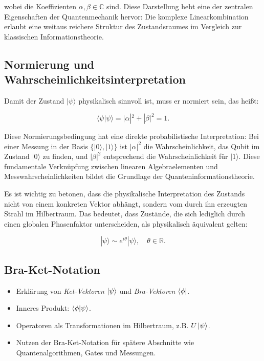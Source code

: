 wobei die Koeffizienten $\alpha, \beta \in \mathbb{C}$ sind. Diese Darstellung hebt eine der zentralen Eigenschaften der Quantenmechanik hervor: Die komplexe Linearkombination erlaubt eine weitaus reichere Struktur des Zustandsraumes im Vergleich zur klassischen Informationstheorie.

\vspace{0.5em}
\subsection*{Normierung und Wahrscheinlichkeitsinterpretation}

Damit der Zustand $|\psi\rangle$ physikalisch sinnvoll ist, muss er normiert sein, das heißt:

\begin{equation}
\langle \psi | \psi \rangle = |\alpha|^2 + |\beta|^2 = 1.
\end{equation}

Diese Normierungsbedingung hat eine direkte probabilistische Interpretation: Bei einer Messung in der Basis $\{ |0\rangle, |1\rangle \}$ ist $|\alpha|^2$ die Wahrscheinlichkeit, das Qubit im Zustand $|0\rangle$ zu finden, und $|\beta|^2$ entsprechend die Wahrscheinlichkeit für $|1\rangle$. Diese fundamentale Verknüpfung zwischen linearen Algebraelementen und Messwahrscheinlichkeiten bildet die Grundlage der Quanteninformationstheorie.

Es ist wichtig zu betonen, dass die physikalische Interpretation des Zustands nicht von einem konkreten Vektor abhängt, sondern vom durch ihn erzeugten Strahl im Hilbertraum. Das bedeutet, dass Zustände, die sich lediglich durch einen globalen Phasenfaktor unterscheiden, als physikalisch äquivalent gelten:

\begin{equation}
|\psi\rangle \sim e^{i\theta}|\psi\rangle, \quad \theta \in \mathbb{R}.
\end{equation}




\subsection{Bra-Ket-Notation}
\begin{itemize}
    \item Erklärung von \textit{Ket-Vektoren} $\ket{\psi}$ und \textit{Bra-Vektoren} $\bra{\phi}$.
    \item Inneres Produkt: $\braket{\phi | \psi}$.
    \item Operatoren als Transformationen im Hilbertraum, z.B. $U \ket{\psi}$.
    \item Nutzen der Bra-Ket-Notation für spätere Abschnitte wie Quantenalgorithmen, Gates und Messungen.
\end{itemize}

